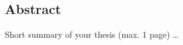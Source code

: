 \clearpage
{}
\pagestyle{plain}

\subsection*{Abstract}
Short summary of your thesis (max. 1 page) \ldots